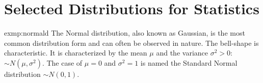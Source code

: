 \section{Selected Distributions for Statistics}\label{app:dist}
\renewcommand{\theexmp}{\Alph{section}.\roman{exmp}}
\begin{exmp}{exmp:normald}
	The Normal distribution, also known as Gaussian, is the most common distribution form and can often be observed in nature. The bell-shape is characteristic. It is characterized by the mean $\mu$ and the variance $\sigma^2>0$: $\sim N(\mu,\sigma^2)$. The case of $\mu=0$ and $\sigma^2=1$ is named the Standard Normal distribution $\sim N(0,1)$.		
	
\end{exmp}
